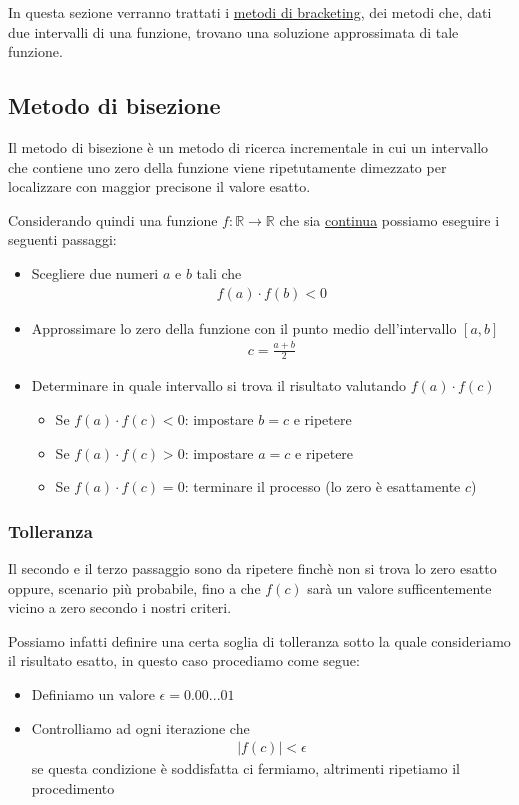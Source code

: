 \documentclass[../main.tex]{subfiles}
\begin{document}
In questa sezione verranno trattati i \underline{metodi di bracketing}, dei metodi che, dati due intervalli di una funzione,
trovano una soluzione approssimata di tale funzione.

\vspace{0.5cm}
\subsection{Metodo di bisezione}
Il metodo di bisezione è un metodo di ricerca incrementale in cui un intervallo che contiene uno zero della funzione viene ripetutamente 
dimezzato per localizzare con maggior precisone il valore esatto.

Considerando quindi una funzione $f: \mathbb{R} \longrightarrow \mathbb{R}$ che sia \underline{continua} possiamo eseguire i seguenti 
passaggi:
\begin{itemize}
    \item Scegliere due numeri $a$ e $b$ tali che \begin{align*}
        f(a) \cdot f(b) < 0
    \end{align*}
    \item Approssimare lo zero della funzione con il punto medio dell'intervallo $[a, b]$ \begin{align*}
        c = \frac{a + b}{2}
    \end{align*}
    \item Determinare in quale intervallo si trova il risultato valutando $f(a) \cdot f(c)$
    \begin{itemize}
        \item Se $f(a) \cdot f(c) < 0$: impostare $b = c$ e ripetere
        \item Se $f(a) \cdot f(c) > 0$: impostare $a = c$ e ripetere
        \item Se $f(a) \cdot f(c) = 0$: terminare il processo (lo zero è esattamente $c$)
    \end{itemize}
\end{itemize}

\vspace{1cm}
\subsubsection{Tolleranza}
Il secondo e il terzo passaggio sono da ripetere finchè non si trova lo zero esatto oppure, scenario più probabile, fino a che $f(c)$
sarà un valore sufficentemente vicino a zero secondo i nostri criteri.

Possiamo infatti definire una certa soglia di tolleranza sotto la quale consideriamo il risultato esatto, in questo caso procediamo come segue:
\begin{itemize}
    \item Definiamo un valore $\epsilon = 0.00...01$
    \item Controlliamo ad ogni iterazione che \begin{align*}
        \left\lvert f(c) \right\rvert < \epsilon
    \end{align*}
    se questa condizione è soddisfatta ci fermiamo, altrimenti ripetiamo il procedimento
\end{itemize}
\end{document}
